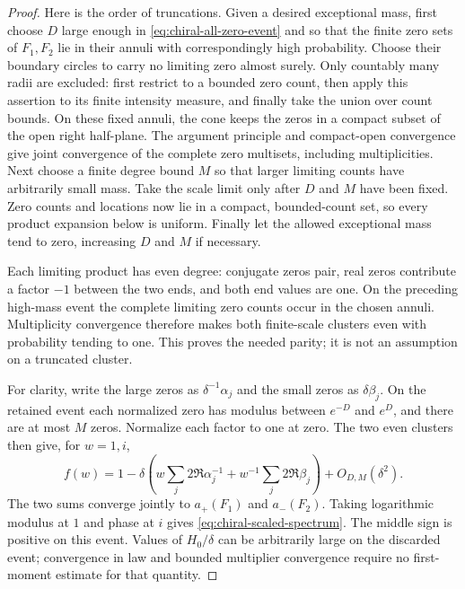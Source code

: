 \begin{proof}
Here is the order of truncations. Given a desired exceptional mass, first
choose $D$ large enough in \eqref{eq:chiral-all-zero-event} and so that
the finite zero sets of $F_1,F_2$ lie in their annuli with correspondingly
high probability. Choose their boundary circles to carry no limiting zero
almost surely. Only countably many radii are excluded: first restrict to
a bounded zero count, then apply this assertion to its finite intensity
measure, and finally take the union over count bounds. On these fixed
annuli, the cone keeps the zeros in a compact subset of the open right
half-plane. The argument principle and compact-open convergence give joint
convergence of the complete zero multisets, including multiplicities.
Next choose a finite degree bound $M$ so that larger limiting counts have
arbitrarily small mass. Take the scale limit only after $D$ and $M$ have
been fixed. Zero counts and locations now lie in a compact, bounded-count
set, so every product expansion below is uniform. Finally let the allowed
exceptional mass tend to zero, increasing $D$ and $M$ if necessary.

Each limiting product has even degree: conjugate zeros pair, real zeros
contribute a factor $-1$ between the two ends, and both end values are one.
On the preceding high-mass event the complete limiting zero counts occur
in the chosen annuli. Multiplicity convergence therefore makes both
finite-scale clusters even with probability tending to one. This proves
the needed parity; it is not an assumption on a truncated cluster.

For clarity, write the large zeros as $\delta^{-1}\alpha_j$ and the
small zeros as $\delta\beta_j$. On the retained event each normalized
zero has modulus between $e^{-D}$ and $e^D$, and there are at most $M$
zeros. Normalize each factor to one at zero. The two even clusters then
give, for $w=1,i$,
\begin{equation}\label{eq:chiral-product-expansion}
 f(w)=1-\delta\left(
       w\sum_j2\Re\alpha_j^{-1}
          +w^{-1}\sum_j2\Re\beta_j\right)+O_{D,M}(\delta^2).
\end{equation}
The two sums converge jointly to $a_+(F_1)$ and $a_-(F_2)$.
Taking logarithmic modulus at $1$ and phase at $i$ gives
\eqref{eq:chiral-scaled-spectrum}. The middle sign is positive on this
event. Values of $H_0/\delta$ can be arbitrarily large on the discarded
event; convergence in law and bounded multiplier convergence require no
first-moment estimate for that quantity.


\end{proof}
